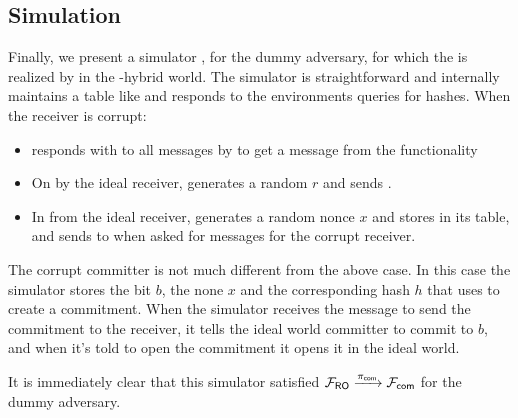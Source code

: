 
\subsection{Simulation}
Finally, we present a simulator \simcom, for the dummy adversary, for which the \Fcom is realized by  in the \Fropp-hybrid world.
The simulator is straightforward and internally maintains a table like \Fro and responds to the environments queries for hashes. 
When the receiver is corrupt:
\begin{itemize}
\item \simcom responds with  to all messages by \Z to get a message from the functionality
\item On  by the ideal receiver, \simcom generates a random $r$ and sends .
\item In  from the ideal receiver, \simcom generates a random nonce $x$ and stores  in its \Fro table, and sends  to \Z when asked for messages for the corrupt receiver.
\end{itemize}

The corrupt committer is not much different from the above case. In this case
the simulator stores the bit $b$, the none $x$ and the corresponding hash $h$ that \Z uses to create a commitment.
When the simulator receives the message to send the commitment to the receiver, it tells the ideal world committer to commit to $b$, and when it's told to open the commitment it opens it in the ideal world. 

It is immediately clear that this simulator satisfied $\mathcal{F}_{{\mathsf {RO}}} \xrightarrow{\pi_{{\mathsf {com}}}} \mathcal{F}_{{\mathsf {com}}}$ for the dummy adversary.


